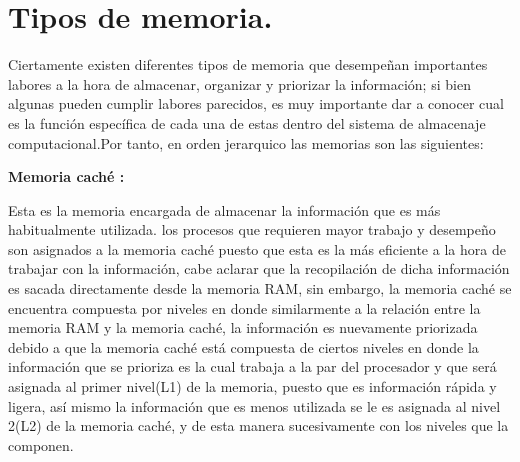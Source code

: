 \documentclass[12pt]{article}
\begin{document}
\section{Tipos de memoria.} \label{contenido}
Ciertamente existen diferentes tipos de memoria que desempeñan importantes labores a la hora de almacenar, organizar y priorizar la información; si bien algunas pueden cumplir labores parecidos, es muy importante dar a conocer cual es la función específica de cada una de estas dentro del sistema de almacenaje computacional.Por tanto, en orden jerarquico las memorias son las siguientes:
\begin{itemize}
\vspace{15PT}
\textbf{Memoria caché :}

Esta es la memoria encargada de almacenar la información que es más habitualmente utilizada. los procesos que requieren mayor trabajo y desempeño son asignados a la memoria caché puesto que esta es la más eficiente a la hora de trabajar con la información, cabe aclarar que la recopilación de dicha información es sacada directamente desde la memoria RAM, sin embargo, la memoria caché se encuentra compuesta por niveles en donde similarmente a la relación entre la memoria RAM y la memoria caché, la información es nuevamente priorizada debido a que la memoria caché está compuesta de ciertos niveles en donde la información que se prioriza es la cual  trabaja a la par del procesador y que será asignada al primer nivel(L1) de la memoria, puesto que es información rápida y ligera, así mismo la información que es menos utilizada se le es asignada al nivel 2(L2) de la memoria caché, y de esta manera sucesivamente con los niveles que la componen.


\end{itemize}
\end{document}
